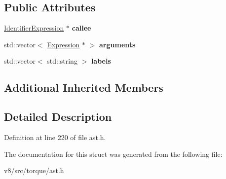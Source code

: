 \subsection*{Public Attributes}
\begin{DoxyCompactItemize}
\item 
\mbox{\label{structv8_1_1internal_1_1torque_1_1CallExpression_a31e85c8850a3aba7fca53c500970fa29}} 
\mbox{\hyperlink{structv8_1_1internal_1_1torque_1_1IdentifierExpression}{Identifier\+Expression}} $\ast$ {\bfseries callee}
\item 
\mbox{\label{structv8_1_1internal_1_1torque_1_1CallExpression_a97ce2e61edb78b2f606290e799ef2e90}} 
std\+::vector$<$ \mbox{\hyperlink{structv8_1_1internal_1_1torque_1_1Expression}{Expression}} $\ast$ $>$ {\bfseries arguments}
\item 
\mbox{\label{structv8_1_1internal_1_1torque_1_1CallExpression_a4875815dfac19d2f9b367278d8c75e0e}} 
std\+::vector$<$ std\+::string $>$ {\bfseries labels}
\end{DoxyCompactItemize}
\subsection*{Additional Inherited Members}


\subsection{Detailed Description}


Definition at line 220 of file ast.\+h.



The documentation for this struct was generated from the following file\+:\begin{DoxyCompactItemize}
\item 
v8/src/torque/ast.\+h\end{DoxyCompactItemize}
